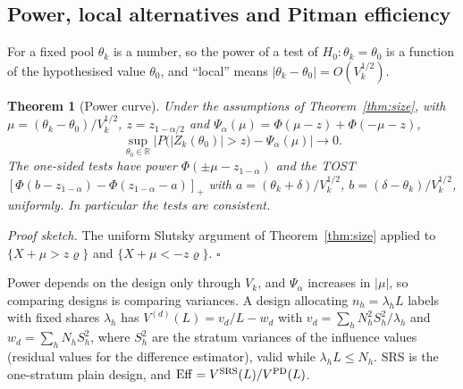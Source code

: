 \documentclass[pdflatex,sn-mathphys-num,iicol]{sn-jnl}
\theoremstyle{thmstyleone}
\newtheorem{theorem}[proposition]{Theorem}
\theoremstyle{thmstyletwo}
\theoremstyle{thmstylethree}
\begin{document}
\subsection{Power, local alternatives and Pitman efficiency}\label{sec:test-power}

For a fixed pool $\theta_k$ is a number, so the power of a test of $H_0:\theta_k=\theta_0$ is a function of the hypothesised value $\theta_0$, and ``local'' means $|\theta_k-\theta_0|=O(V_k^{1/2})$.

\begin{theorem}[Power curve]\label{thm:power}
Under the assumptions of Theorem~\ref{thm:size}, with $\mu=(\theta_k-\theta_0)/V_k^{1/2}$, $z=z_{1-\alpha/2}$ and $\Psi_\alpha(\mu)=\Phi(\mu-z)+\Phi(-\mu-z)$,
\begin{equation}\label{eq:power}
\sup_{\theta_0\in\mathbb R}\Big|P\big(|Z_k(\theta_0)|>z\big)-\Psi_\alpha(\mu)\Big|\to0 .
\end{equation}
The one-sided tests have power $\Phi(\pm\mu-z_{1-\alpha})$ and the TOST $[\Phi(b-z_{1-\alpha})-\Phi(z_{1-\alpha}-a)]_+$ with $a=(\theta_k+\delta)/V_k^{1/2}$, $b=(\delta-\theta_k)/V_k^{1/2}$, uniformly. In particular the tests are consistent.
\end{theorem}

\emph{Proof sketch.} The uniform Slutsky argument of Theorem~\ref{thm:size} applied to $\{X+\mu>z\varrho\}$ and $\{X+\mu<-z\varrho\}$. $\square$

Power depends on the design only through $V_k$, and $\Psi_\alpha$ increases in $|\mu|$, so comparing designs is comparing variances. A design allocating $n_h=\lambda_hL$ labels with fixed shares $\lambda_h$ has $V^{(d)}(L)=v_d/L-w_d$ with $v_d=\sum_hN_h^2S^2_h/\lambda_h$ and $w_d=\sum_hN_hS^2_h$, where $S^2_h$ are the stratum variances of the influence values (residual values for the difference estimator), valid while $\lambda_hL\le N_h$. SRS is the one-stratum plain design, and $\mathrm{Eff}=V^{\rm SRS}(L)/V^{\rm PD}(L)$.
\end{document}
